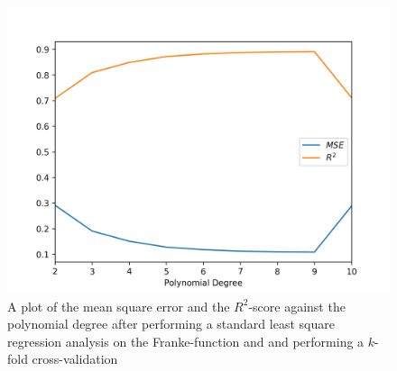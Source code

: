 \documentclass[a4paper,10pt,english]{article}
\begin{document}
\begin{figure}[H]
	\centering 
	\includegraphics[scale=0.9]{HiResData/franke_output/part_B.png}
	\caption{
		A plot of the mean square error and the $R^2$-score against the polynomial degree after performing a standard least square regression analysis on the Franke-function and and performing a $k$-fold cross-validation
	}
	\label{part_b}
\end{figure}
\end{document}
